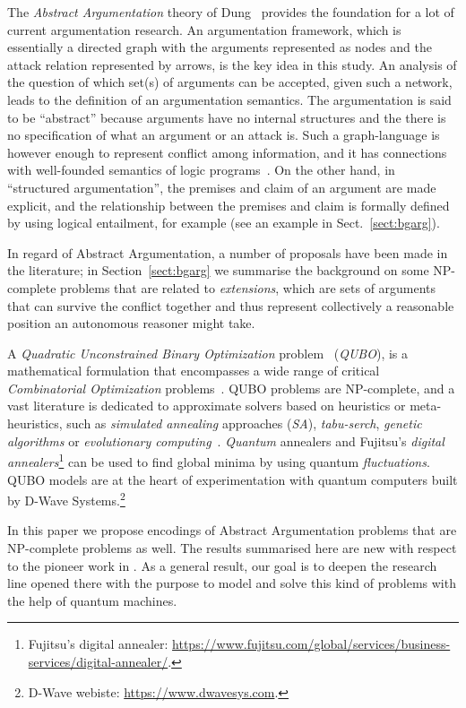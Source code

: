 \documentclass[conference]{IEEEtran}
\begin{document}
The \emph{Abstract Argumentation} theory of Dung~\cite{Dung:1995} provides the foundation for a lot of current argumentation research. An argumentation framework, which is essentially a directed graph with the arguments represented as nodes and the attack relation represented by arrows, is the key idea in this study. An analysis of the question of which set(s) of arguments can be accepted, given such a network, leads to the definition of an argumentation semantics. 
The argumentation is said to be ``abstract'' because arguments have no internal structures and the there is no specification of what an argument or an attack is. Such a graph-language is however enough to represent conflict among information, and it has connections with well-founded semantics of logic programs~\cite{wellfounded}.
On the  other hand, in ``structured argumentation'',  the premises and claim of an argument are made explicit, and the relationship between the premises and claim is formally defined by using logical entailment, for example (see an example in Sect.~\ref{sect:bgarg}).

In regard of Abstract Argumentation, a number of proposals have been made in the literature; in Section~\ref{sect:bgarg} we summarise the background on  some NP-complete problems  that are related to \emph{extensions}, which are sets of arguments that can survive the conflict together and thus represent collectively a reasonable position an autonomous reasoner might take. 


A \emph{Quadratic Unconstrained Binary Optimization} problem~\cite{firstworkqubo} (\emph{QUBO}),  is a mathematical formulation that  encompasses a wide range of critical \emph{Combinatorial Optimization} problems~\cite{survey2,survey1}.  QUBO problems are  NP-complete, and a vast literature is dedicated to approximate solvers  based on heuristics or meta-heuristics, such as  \emph{simulated annealing} approaches (\emph{SA}), \emph{tabu-serch}, \emph{genetic algorithms} or \emph{evolutionary computing}~\cite{survey1}. \emph{Quantum} annealers  and Fujitsu's \emph{digital annealers}\footnote{Fujitsu's digital annealer: \url{https://www.fujitsu.com/global/services/business-services/digital-annealer/}.} can be used to find global minima by using quantum \emph{fluctuations}.  QUBO models are  at the heart of experimentation with quantum computers built by D-Wave Systems.\footnote{D-Wave webiste: \url{https://www.dwavesys.com}.}

In this paper we propose encodings of Abstract Argumentation problems that are NP-complete problems as well. The  results summarised here are new with respect to the pioneer  work in \cite{pricai22}. As a general result, our goal is to deepen  the research line opened there with the purpose to model  and solve this kind of problems with the help of quantum machines.
\end{document}
